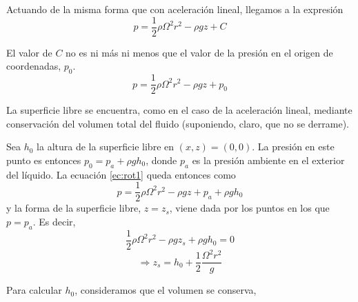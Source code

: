 Actuando de la misma forma que con aceleración lineal, llegamos a la expresión
\begin{equation}
	p = \frac{1}{2}\rho \Omega^2 r^2 - \rho g z + C 
\end{equation} 


El valor de $C$ no es ni más ni menos que el valor de la presión en el origen de coordenadas, $p_0$.
\begin{equation}
	p = \frac{1}{2}\rho \Omega^2 r^2 - \rho g z + p_0 
	\label{ec:rot1}
\end{equation} 

La superficie libre se encuentra, como en el caso de la aceleración lineal, mediante conservación del volumen total del fluido (suponiendo, claro, que no se derrame). 

Sea $h_0$ la altura de la superficie libre en $(x,z)=(0,0)$. La presión en este punto es entonces $p_0=p_a + \rho g h_0$, donde $p_a$ es la presión ambiente en el exterior del líquido. La ecuación \ref{ec:rot1} queda entonces como 
\begin{equation}
	p = \frac{1}{2}\rho \Omega^2 r^2 - \rho g z + p_a + \rho g h_0
	\label{ec:rot2}
\end{equation} 
y la forma de la superficie libre, $z=z_s$, viene dada por los puntos en los que $p=p_a$. Es decir,
\begin{equation}
	\frac{1}{2}\rho \Omega^2 r^2 - \rho g z_s + \rho g h_0 = 0
\end{equation} 
\begin{equation}
	\Rightarrow  z_s = h_0 + \frac{1}{2}\frac{\Omega^2 r^2}{g} 
\end{equation} 

Para calcular $h_0$, consideramos que el volumen se conserva,

